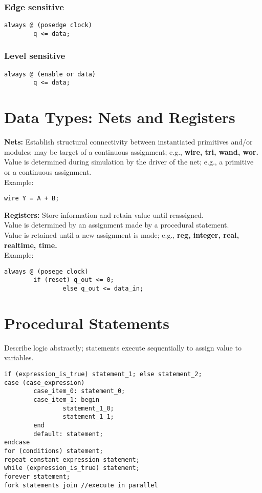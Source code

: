 \documentclass[10pt,twocolumn]{article}
\begin{document}
\subsubsection*{Edge sensitive}\vspace{-10pt}
\begin{lstlisting}
always @ (posedge clock)
        q <= data;
\end{lstlisting}
\subsubsection*{Level sensitive}\vspace{-10pt}
\begin{lstlisting}
always @ (enable or data)
        q <= data;
\end{lstlisting}
%
\section*{Data Types: Nets and Registers}\vspace{-10pt}
\textbf{Nets:} Establish structural connectivity between instantiated primitives and/or modules; may be target of a continuous assignment; e.g., \textbf{wire, tri, wand, wor.} \\
Value is determined during simulation by the driver of the net; e.g., a primitive or a continuous assignment. \\
Example: 
\begin{lstlisting}
wire Y = A + B;
\end{lstlisting}
\textbf{Registers:} Store information and retain value until reassigned.\\
Value is determined by an assignment made by a procedural statement.\\
Value is retained until a new assignment is made; e.g., \textbf{reg, integer, real, realtime, time.}\\
Example:
\begin{lstlisting}
always @ (posege clock)
        if (reset) q_out <= 0;
                else q_out <= data_in;
\end{lstlisting}
%
\section*{Procedural Statements}\vspace{-10pt}
Describe logic abstractly; statements execute sequentially to assign value to variables.
\begin{lstlisting}
if (expression_is_true) statement_1; else statement_2;
case (case_expression)
        case_item_0: statement_0;
        case_item_1: begin
                statement_1_0;
                statement_1_1;
        end
        default: statement;
endcase
for (conditions) statement;
repeat constant_expression statement;
while (expression_is_true) statement;
forever statement;
fork statements join //execute in parallel
\end{lstlisting}
%
\end{document}

